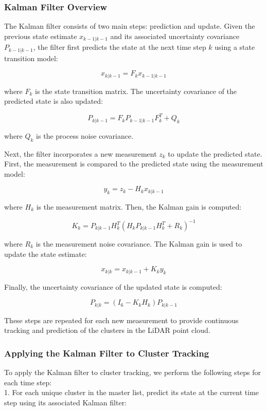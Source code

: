 \documentclass[journal]{IEEEtran} %
\begin{document}
\subsubsection{Kalman Filter Overview}

The Kalman filter consists of two main steps: prediction and update. Given the previous state estimate $x_{k-1|k-1}$ and its associated uncertainty covariance $P_{k-1|k-1}$, the filter first predicts the state at the next time step $k$ using a state transition model:

\[
x_{k|k-1} = F_k x_{k-1|k-1}
\]

where $F_k$ is the state transition matrix. The uncertainty covariance of the predicted state is also updated:

\[
P_{k|k-1} = F_k P_{k-1|k-1} F_k^T + Q_k
\]

where $Q_k$ is the process noise covariance.

Next, the filter incorporates a new measurement $z_k$ to update the predicted state. First, the measurement is compared to the predicted state using the measurement model:

\[
y_k = z_k - H_k x_{k|k-1}
\]

where $H_k$ is the measurement matrix. Then, the Kalman gain is computed:

\[
K_k = P_{k|k-1} H_k^T (H_k P_{k|k-1} H_k^T + R_k)^{-1}
\]

where $R_k$ is the measurement noise covariance. The Kalman gain is used to update the state estimate:

\[
x_{k|k} = x_{k|k-1} + K_k y_k
\]

Finally, the uncertainty covariance of the updated state is computed:

\[
P_{k|k} = (I_6 - K_k H_k) P_{k|k-1}
\]

These steps are repeated for each new measurement to provide continuous tracking and prediction of the clusters in the LiDAR point cloud.

\subsubsection{Applying the Kalman Filter to Cluster Tracking}

To apply the Kalman filter to cluster tracking, we perform the following steps for each time step:\\

1. For each unique cluster in the master list, predict its state at the current time step using its associated Kalman filter:
\end{document}
